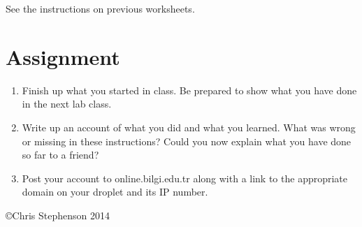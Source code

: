 \documentclass[12pt, a4paper]{article}
\begin{document}
See the instructions on previous worksheets.


\section*{Assignment}

\begin{enumerate}
\item Finish up what you started in class. Be prepared to show what you have done in the next lab class. 
\item Write up an account of what you did and what you learned. What was wrong or missing in these instructions? Could you now explain what you have done so far to a friend?
\item Post your account to online.bilgi.edu.tr along with a link to the appropriate domain on your droplet and its IP number.

\end{enumerate}

\copyright Chris Stephenson 2014
\end{document}
